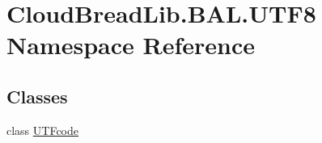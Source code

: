 \hypertarget{a00431}{}\section{Cloud\+Bread\+Lib.\+B\+A\+L.\+U\+T\+F8 Namespace Reference}
\label{a00431}
\subsection*{Classes}
\begin{DoxyCompactItemize}
\item 
class \hyperlink{a00190}{U\+T\+Fcode}
\end{DoxyCompactItemize}
